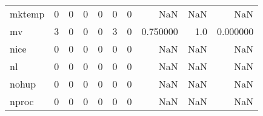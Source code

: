 \begin{tabular}{lrrrrrrrrr}
mktemp    &                                       0 &                                                  0 &                                                  0 &                                                  0 &                                                  0 &                                                  0 &                                                NaN &                                    NaN &                                  NaN \\
mv        &                                       3 &                                                  0 &                                                  0 &                                                  0 &                                                  3 &                                                  0 &                                           0.750000 &                                    1.0 &                             0.000000 \\
nice      &                                       0 &                                                  0 &                                                  0 &                                                  0 &                                                  0 &                                                  0 &                                                NaN &                                    NaN &                                  NaN \\
nl        &                                       0 &                                                  0 &                                                  0 &                                                  0 &                                                  0 &                                                  0 &                                                NaN &                                    NaN &                                  NaN \\
nohup     &                                       0 &                                                  0 &                                                  0 &                                                  0 &                                                  0 &                                                  0 &                                                NaN &                                    NaN &                                  NaN \\
nproc     &                                       0 &                                                  0 &                                                  0 &                                                  0 &                                                  0 &                                                  0 &                                                NaN &                                    NaN &                                  NaN \\

\end{tabular}
